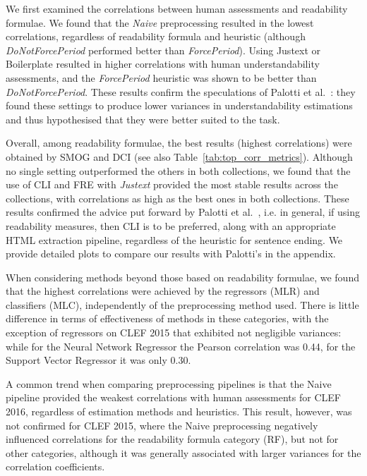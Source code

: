 \documentclass[10pt,a4paper]{article}
\begin{document}
We first examined the correlations between human assessments and readability formulae. We found that the \textit{Naive} preprocessing resulted in the lowest correlations, regardless of readability formula and heuristic (although \textit{DoNotForcePeriod} performed better than \textit{ForcePeriod}). Using Justext or Boilerplate resulted in higher correlations with human understandability assessments, and the \textit{ForcePeriod} heuristic was shown to be better than \textit{DoNotForcePeriod}. These results confirm the speculations of Palotti et al.~\cite{palotti15}: they found these settings to produce lower variances in understandability estimations and thus hypothesised that they were better suited to the task.

Overall, among readability formulae, the best results (highest correlations) were obtained by SMOG and DCI (see also Table~\ref{tab:top_corr_metrics}). Although no single setting outperformed the others in both collections, we found that the use of CLI and FRE with \textit{Justext} provided the most stable results across the collections, with correlations as high as the best ones in both collections.
These results confirmed the advice put forward by Palotti et al.~\cite{palotti15}, i.e. in general, if using readability measures, then CLI is to be preferred, along with an appropriate HTML extraction pipeline, regardless of the heuristic for sentence ending. We provide detailed plots to compare our results with Palotti's in the appendix.

When considering methods beyond those based on readability formulae, we found that the highest correlations were achieved by the regressors (MLR) and classifiers (MLC), independently of the preprocessing method used. There is little difference in terms of effectiveness of methods in these categories, with the exception of regressors on CLEF 2015 that exhibited not negligible variances: while for the Neural Network Regressor the Pearson correlation was 0.44, for the Support Vector Regressor it was only 0.30.

A common trend when comparing preprocessing pipelines is that the Naive pipeline provided the weakest correlations with human assessments for CLEF 2016, regardless of estimation methods and heuristics. This result, however, was not confirmed for CLEF 2015, where the Naive preprocessing negatively influenced correlations for the readability formula category (RF), but not for other categories, although it was generally associated with larger variances for the correlation coefficients.
\end{document}
